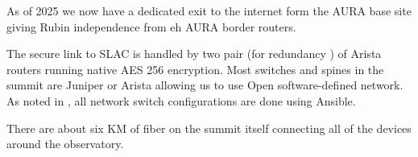 As of 2025 we now have a dedicated exit to the internet form the AURA base site giving Rubin independence from eh AURA border routers.

The secure link to SLAC is handled by two pair (for redundancy ) of Arista routers running native AES 256 encryption.
Most switches and spines in the summit are Juniper or Arista allowing us to use Open software-defined network.
As noted in , all network switch configurations are done using Ansible.

There are about  six KM of fiber on the summit itself connecting all of the devices around the observatory.


